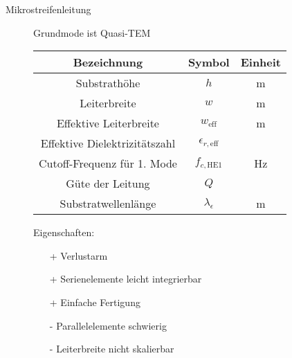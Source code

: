 \begin{description}
\item[Mikrostreifenleitung] Grundmode ist Quasi-TEM
\begin{center}
\begin{tabular}{ccc} \toprule
Bezeichnung & Symbol & Einheit \\ \midrule
Substrathöhe & $h$ & \si{\meter} \\
Leiterbreite & $w$ & \si{\meter} \\
Effektive Leiterbreite & $w_\text{eff}$ &  \si{\meter}\\
Effektive Dielektrizitätszahl & $\epsilon_{r,\text{eff}}$ \\
Cutoff-Frequenz für 1. Mode & $f_{c,\text{HE1}}$ & \si{\hertz} \\
Güte der Leitung & $Q$ & \\
Substratwellenlänge & $\lambda_\epsilon$ & \si{\meter} \\
\bottomrule
\end{tabular}
\end{center}

Eigenschaften:
\begin{itemize}
\item[+] Verlustarm
\item[+] Serienelemente leicht integrierbar
\item[+] Einfache Fertigung
\item[-] Parallelelemente schwierig
\item[-] Leiterbreite nicht skalierbar
\end{itemize}


\end{description}
